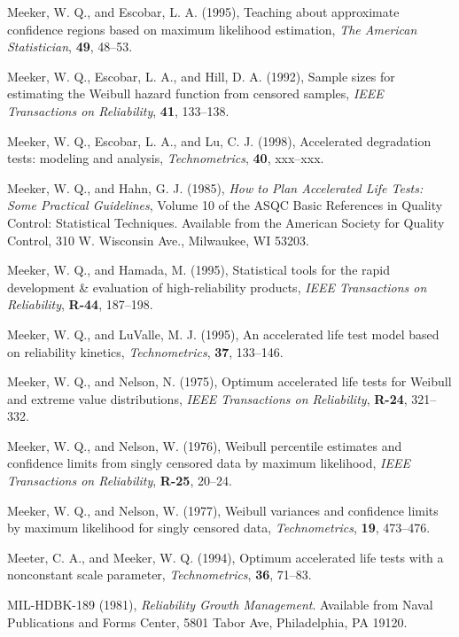 \begin{thebibliography}{999}
Meeker, W. Q., and Escobar, L. A. (1995), Teaching about
approximate confidence regions based on maximum likelihood estimation,
{\em The American Statistician}, {\bf 49}, 48--53.

Meeker, W. Q., Escobar, L. A., and Hill, D. A.  (1992), Sample sizes for
estimating the Weibull hazard function from censored samples, {\em
IEEE Transactions on Reliability}, {\bf 41}, 133--138.

Meeker, W. Q., Escobar, L. A., and Lu, C. J. (1998), Accelerated
degradation tests: modeling and analysis,  {\em Technometrics},
{\bf 40}, xxx--xxx.

Meeker, W. Q., and Hahn, G. J. (1985), {\em How to Plan Accelerated
Life Tests: Some Practical Guidelines}, Volume 10 of the ASQC Basic
References in Quality Control: Statistical Techniques. Available from
the American Society for Quality Control, 310 W. Wisconsin Ave.,
Milwaukee, WI 53203.

Meeker, W. Q., and Hamada, M. (1995), Statistical tools for the
rapid development \& evaluation of high-reliability products, {\em
IEEE Transactions on Reliability}, {\bf R-44}, 187--198.

Meeker, W. Q., and LuValle, M. J. (1995), An accelerated life test
model based on reliability kinetics, {\em Technometrics},
{\bf 37}, 133--146.

Meeker, W. Q., and Nelson, N. (1975), Optimum accelerated life tests
for Weibull and extreme value distributions, {\em IEEE Transactions
on Reliability}, {\bf R-24}, 321--332.

Meeker, W. Q., and Nelson, W. (1976), Weibull percentile estimates and
confidence limits from singly censored data by maximum likelihood,
{\em IEEE Transactions on Reliability}, {\bf R-25}, 20--24.

Meeker, W. Q., and Nelson, W. (1977), Weibull variances 
and confidence limits by maximum likelihood
for singly censored data, {\em Technometrics}, {\bf 19},
473--476.

Meeter, C. A., and Meeker, W. Q. (1994), Optimum accelerated life
tests with a nonconstant scale parameter, {\em Technometrics}, {\bf
36}, 71--83.

MIL-HDBK-189 (1981), {\em Reliability Growth Management}.
Available from Naval Publications and Forms Center, 5801 Tabor Ave,
Philadelphia, PA 19120.


\end{thebibliography}
